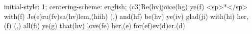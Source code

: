 initial-style: 1;
centering-scheme: english;
(c3)Re(hv)joice(hg) ye(f) <sp>*</sp> with(f) Je(e)ru(fv)sa(hv)lem,(hiih) (,) and(hf) be(hv) ye(iv) glad(ji) with(hi) her,(f) (,) all(fi) ye(g) that(hv) love(fe) her,(e) for(ef)ev(d)er.(d)
